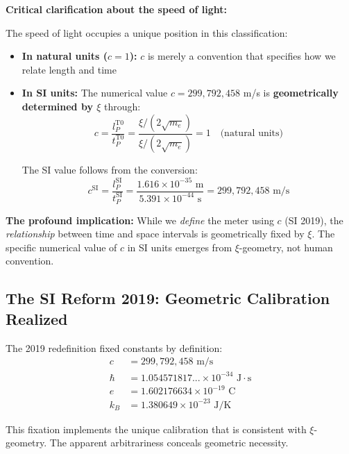 \documentclass[12pt,a4paper]{article}
\begin{document}
	\begin{warning}
		\textbf{Critical clarification about the speed of light:}
		
		The speed of light occupies a unique position in this classification:
		
		\begin{itemize}
			\item \textbf{In natural units ($c = 1$):} $c$ is merely a convention that specifies how we relate length and time
			
			\item \textbf{In SI units:} The numerical value $c = 299,792,458$ m/s is \textbf{geometrically determined by $\xi$} through:
			\begin{equation}
				c = \frac{l_P^{\text{T0}}}{t_P^{\text{T0}}} = \frac{\xi/(2\sqrt{m_e})}{\xi/(2\sqrt{m_e})} = 1 \quad \text{(natural units)}
			\end{equation}
			
			The SI value follows from the conversion:
			\begin{equation}
				c^{\text{SI}} = \frac{l_P^{\text{SI}}}{t_P^{\text{SI}}} = \frac{1.616 \times 10^{-35} \text{ m}}{5.391 \times 10^{-44} \text{ s}} = 299,792,458 \text{ m/s}
			\end{equation}
		\end{itemize}
		
		\textbf{The profound implication:} While we \emph{define} the meter using $c$ (SI 2019), the \emph{relationship} between time and space intervals is geometrically fixed by $\xi$. The specific numerical value of $c$ in SI units emerges from $\xi$-geometry, not human convention.
	\end{warning}
	
	\subsection{The SI Reform 2019: Geometric Calibration Realized}
	
	The 2019 redefinition fixed constants by definition:
	\begin{align}
		c &= 299,792,458 \text{ m/s} \\
		\hbar &= 1.054571817... \times 10^{-34} \text{ J}\cdot\text{s} \\
		e &= 1.602176634 \times 10^{-19} \text{ C} \\
		k_B &= 1.380649 \times 10^{-23} \text{ J/K}
	\end{align}
	
	\begin{insight}
		This fixation implements the unique calibration that is consistent with $\xi$-geometry. The apparent arbitrariness conceals geometric necessity.
	\end{insight}
	
\end{document}
